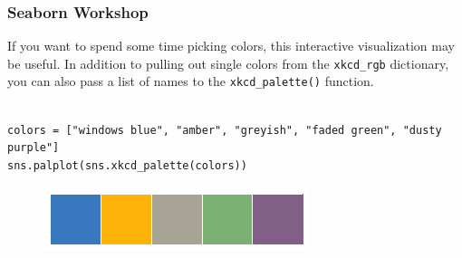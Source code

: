 \documentclass{beamer}
\begin{document}
\begin{frame}[fragile]
	\frametitle{Seaborn Workshop}
	\large
If you want to spend some time picking colors, this interactive visualization may be useful. In addition to pulling out single colors from the \texttt{xkcd\_rgb} dictionary, you can also pass a list of names to the \texttt{xkcd\_palette()} function.
\begin{verbatim}

colors = ["windows blue", "amber", "greyish", "faded green", "dusty purple"]
sns.palplot(sns.xkcd_palette(colors))
\end{verbatim}

\begin{figure}
\centering
\includegraphics[width=0.7\linewidth]{images/color_palettes_23_0}

\end{figure}

\end{frame}
\end{document}

